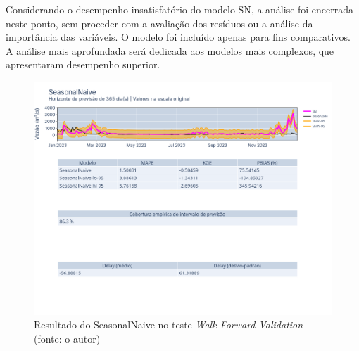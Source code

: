 Considerando o desempenho insatisfatório do modelo SN, a análise foi encerrada neste ponto, sem proceder com a avaliação dos resíduos ou a análise da importância das variáveis. O modelo foi incluído apenas para fins comparativos. A análise mais aprofundada será dedicada aos modelos mais complexos, que apresentaram desempenho superior.

\begin{figure}[!h]
	\centering
	\includegraphics[scale=0.33]{Figuras/jequiti/resultados/SN_WFV.png}
	\caption{Resultado do SeasonalNaive no teste \textit{Walk-Forward Validation}\\(fonte: o autor)}
	\label{fig:jequiti_SN_WFV}
\end{figure}


